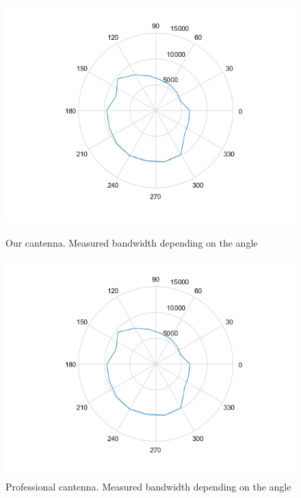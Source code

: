 			\begin{figure}\begin{center}
					\includegraphics[width=\figurewidth]{plots/polar_can_b.png}
					\caption{Our cantenna. Measured bandwidth depending on the angle}
					\label{img:ang:band:can}
					
					\includegraphics[width=\figurewidth]{plots/polar_prof_b.png}
					\caption{Professional cantenna. Measured bandwidth depending on the angle}
					\label{img:ang:band:prof}
					

\end{center}
\end{figure}
